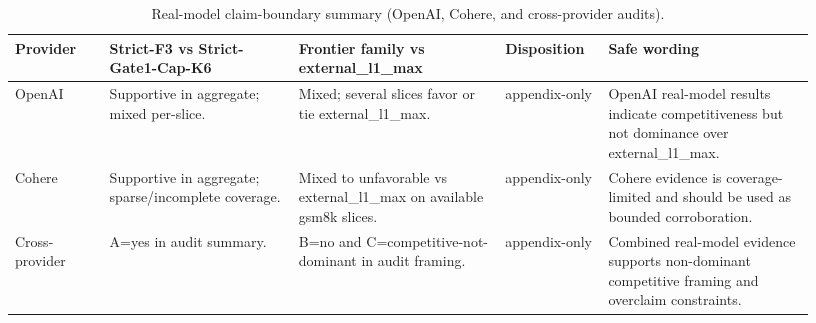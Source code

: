 \begin{table}[t]
\centering
\small
\caption{Real-model claim-boundary summary (OpenAI, Cohere, and cross-provider audits).}
\begin{tabular}{p{0.11\linewidth}p{0.22\linewidth}p{0.24\linewidth}p{0.12\linewidth}p{0.24\linewidth}}
\hline
\textbf{Provider} & \textbf{Strict-F3 vs Strict-Gate1-Cap-K6} & \textbf{Frontier family vs external\_l1\_max} & \textbf{Disposition} & \textbf{Safe wording} \\
\hline
OpenAI & Supportive in aggregate; mixed per-slice. & Mixed; several slices favor or tie external\_l1\_max. & appendix-only & OpenAI real-model results indicate competitiveness but not dominance over external\_l1\_max. \\
Cohere & Supportive in aggregate; sparse/incomplete coverage. & Mixed to unfavorable vs external\_l1\_max on available gsm8k slices. & appendix-only & Cohere evidence is coverage-limited and should be used as bounded corroboration. \\
Cross-provider & A=yes in audit summary. & B=no and C=competitive-not-dominant in audit framing. & appendix-only & Combined real-model evidence supports non-dominant competitive framing and overclaim constraints. \\
\hline
\end{tabular}
\end{table}
